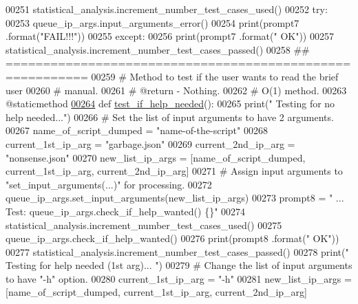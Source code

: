 \begin{DoxyCode}
00251         statistical\_analysis.increment\_number\_test\_cases\_used()
00252         \textcolor{keywordflow}{try}:
00253             queue\_ip\_args.input\_arguments\_error()
00254             print(prompt7 .format(\textcolor{stringliteral}{"FAIL!!!"}))
00255         \textcolor{keywordflow}{except}:
00256             print(prompt7 .format(\textcolor{stringliteral}{" OK"}))
00257             statistical\_analysis.increment\_number\_test\_cases\_passed()
00258     \textcolor{comment}{## =========================================================}
00259     \textcolor{comment}{#   Method to test if the user wants to read the brief user}
00260     \textcolor{comment}{#       manual.}
00261     \textcolor{comment}{#   @return - Nothing.}
00262     \textcolor{comment}{#   O(1) method.}
00263     @staticmethod
\hypertarget{queue__ip__arguments__tester_8py_source_l00264}{}\hyperlink{classutilities_1_1queue__ip__arguments__tester_1_1queue__ip__args__tester_a4af9d2177916d79d95fc9de5531162af}{00264}     \textcolor{keyword}{def }\hyperlink{classutilities_1_1queue__ip__arguments__tester_1_1queue__ip__args__tester_a4af9d2177916d79d95fc9de5531162af}{test\_if\_help\_needed}():
00265         print(\textcolor{stringliteral}{" Testing for no help needed..."})
00266         \textcolor{comment}{#   Set the list of input arguments to have 2 arguments.}
00267         name\_of\_script\_dumped = \textcolor{stringliteral}{"name-of-the-script"}
00268         current\_1st\_ip\_arg = \textcolor{stringliteral}{"garbage.json"}
00269         current\_2nd\_ip\_arg = \textcolor{stringliteral}{"nonsense.json"}
00270         new\_list\_ip\_args = [name\_of\_script\_dumped, current\_1st\_ip\_arg, current\_2nd\_ip\_arg]
00271         \textcolor{comment}{#   Assign input arguments to "set\_input\_arguments(...)" for processing.}
00272         queue\_ip\_args.set\_input\_arguments(new\_list\_ip\_args)
00273         prompt8 = \textcolor{stringliteral}{" ... Test: queue\_ip\_args.check\_if\_help\_wanted()  \{\}"}
00274         statistical\_analysis.increment\_number\_test\_cases\_used()
00275         queue\_ip\_args.check\_if\_help\_wanted()
00276         print(prompt8 .format(\textcolor{stringliteral}{" OK"}))
00277         statistical\_analysis.increment\_number\_test\_cases\_passed()
00278         print(\textcolor{stringliteral}{" Testing for help needed (1st arg)... "})
00279         \textcolor{comment}{#   Change the list of input arguments to have "-h" option.}
00280         current\_1st\_ip\_arg = \textcolor{stringliteral}{"-h"}
00281         new\_list\_ip\_args = [name\_of\_script\_dumped, current\_1st\_ip\_arg, current\_2nd\_ip\_arg]

\end{DoxyCode}
